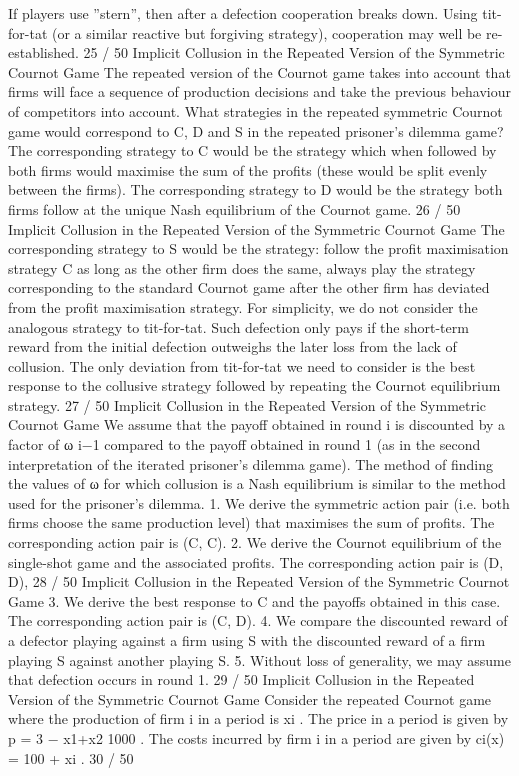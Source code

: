 \documentclass[]{report}
\begin{document}
If players use ”stern”, then after a defection cooperation breaks
down. Using tit-for-tat (or a similar reactive but forgiving
strategy), cooperation may well be re-established.
25 / 50
Implicit Collusion in the Repeated Version of the
Symmetric Cournot Game
The repeated version of the Cournot game takes into account that
firms will face a sequence of production decisions and take the
previous behaviour of competitors into account.
What strategies in the repeated symmetric Cournot game would
correspond to C, D and S in the repeated prisoner’s dilemma
game?
The corresponding strategy to C would be the strategy which
when followed by both firms would maximise the sum of the profits
(these would be split evenly between the firms).
The corresponding strategy to D would be the strategy both firms
follow at the unique Nash equilibrium of the Cournot game.
26 / 50
Implicit Collusion in the Repeated Version of the
Symmetric Cournot Game
The corresponding strategy to S would be the strategy: follow the
profit maximisation strategy C as long as the other firm does the
same, always play the strategy corresponding to the standard
Cournot game after the other firm has deviated from the profit
maximisation strategy.
For simplicity, we do not consider the analogous strategy to
tit-for-tat.
Such defection only pays if the short-term reward from the initial
defection outweighs the later loss from the lack of collusion. The
only deviation from tit-for-tat we need to consider is the best
response to the collusive strategy followed by repeating the
Cournot equilibrium strategy.
27 / 50
Implicit Collusion in the Repeated Version of the
Symmetric Cournot Game
We assume that the payoff obtained in round i is discounted by a
factor of ω
i−1
compared to the payoff obtained in round 1 (as in
the second interpretation of the iterated prisoner’s dilemma game).
The method of finding the values of ω for which collusion is a
Nash equilibrium is similar to the method used for the prisoner’s
dilemma.
1. We derive the symmetric action pair (i.e. both firms
choose the same production level) that maximises
the sum of profits. The corresponding action pair is
(C, C).
2. We derive the Cournot equilibrium of the single-shot
game and the associated profits. The corresponding
action pair is (D, D),
28 / 50
Implicit Collusion in the Repeated Version of the
Symmetric Cournot Game
3. We derive the best response to C and the payoffs
obtained in this case. The corresponding action pair
is (C, D).
4. We compare the discounted reward of a defector
playing against a firm using S with the discounted
reward of a firm playing S against another playing S.
5. Without loss of generality, we may assume that
defection occurs in round 1.
29 / 50
Implicit Collusion in the Repeated Version of the
Symmetric Cournot Game
Consider the repeated Cournot game where the production of firm
i in a period is xi
.
The price in a period is given by p = 3 −
x1+x2
1000 .
The costs incurred by firm i in a period are given by
ci(x) = 100 + xi
.
30 / 50
\end{document}
